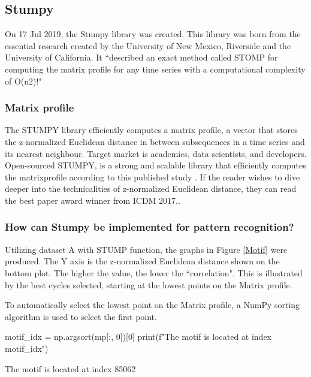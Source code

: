 \subsection{Stumpy}
On 17 Jul 2019, the Stumpy library was created. This library was born from the essential research created by the  University of New Mexico, Riverside and the University of California. It ``described an exact method called STOMP for computing the matrix profile for any time series with a computational complexity of O(n2)!" \cite{law2019stumpy} 

\subsubsection{Matrix profile} 
The STUMPY library efficiently computes a matrix profile, a vector that stores the z-normalized Euclidean distance in between subsequences in a time series and its nearest neighbour. Target market is academics, data scientists, and developers. Open-sourced STUMPY, is a strong and scalable library that efficiently computes the matrixprofile according to this published study \cite{law2019stumpy}. If the reader wishes to dive deeper into the technicalities of z-normalized Euclidean distance, they can read the best paper award winner from ICDM 2017.\cite{zhu_imamura_nikovski_keogh_2017}.

\subsubsection{How can Stumpy be implemented for pattern recognition?}
Utilizing dataset A with STUMP function, the graphs in Figure \ref{Motif} were produced.
The Y axis is the z-normalized Euclidean distance shown on the bottom plot. The higher the value, the lower the ``correlation". This is illustrated by the best cycles selected, starting at the lowest points on the Matrix profile.

To automatically select the lowest point on the Matrix profile, a NumPy sorting algorithm is used to select the first point.

\begin{python}
motif_idx = np.argsort(mp[:, 0])[0]
print(f"The motif is located at index {motif_idx}")
\end{python}
The motif is located at index 85062

